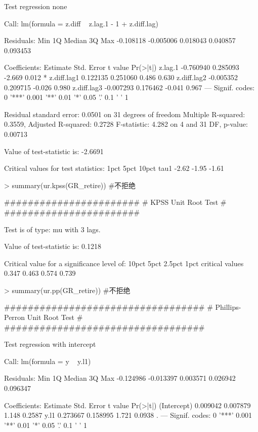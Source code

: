 \documentclass{article}
\begin{document}
\begin{Schunk}
\begin{Soutput}
Test regression none 


Call:
lm(formula = z.diff ~ z.lag.1 - 1 + z.diff.lag)

Residuals:
      Min        1Q    Median        3Q       Max 
-0.108118 -0.005006  0.018043  0.040857  0.093453 

Coefficients:
             Estimate Std. Error t value Pr(>|t|)  
z.lag.1     -0.760940   0.285093  -2.669    0.012 *
z.diff.lag1  0.122135   0.251060   0.486    0.630  
z.diff.lag2 -0.005352   0.209715  -0.026    0.980  
z.diff.lag3 -0.007293   0.176462  -0.041    0.967  
---
Signif. codes:  0 '***' 0.001 '**' 0.01 '*' 0.05 '.' 0.1 ' ' 1

Residual standard error: 0.0501 on 31 degrees of freedom
Multiple R-squared:  0.3559,	Adjusted R-squared:  0.2728 
F-statistic: 4.282 on 4 and 31 DF,  p-value: 0.00713


Value of test-statistic is: -2.6691 

Critical values for test statistics: 
      1pct  5pct 10pct
tau1 -2.62 -1.95 -1.61
\end{Soutput}
\begin{Sinput}
> summary(ur.kpss(GR_retire)) #不拒绝
\end{Sinput}
\begin{Soutput}
####################### 
# KPSS Unit Root Test # 
####################### 

Test is of type: mu with 3 lags. 

Value of test-statistic is: 0.1218 

Critical value for a significance level of: 
                10pct  5pct 2.5pct  1pct
critical values 0.347 0.463  0.574 0.739
\end{Soutput}
\begin{Sinput}
> summary(ur.pp(GR_retire)) #不拒绝
\end{Sinput}
\begin{Soutput}
################################## 
# Phillips-Perron Unit Root Test # 
################################## 

Test regression with intercept 


Call:
lm(formula = y ~ y.l1)

Residuals:
      Min        1Q    Median        3Q       Max 
-0.124986 -0.013397  0.003571  0.026942  0.096347 

Coefficients:
            Estimate Std. Error t value Pr(>|t|)  
(Intercept) 0.009042   0.007879   1.148   0.2587  
y.l1        0.273667   0.158995   1.721   0.0938 .
---
Signif. codes:  0 '***' 0.001 '**' 0.01 '*' 0.05 '.' 0.1 ' ' 1


\end{Soutput}
\end{Schunk}
\end{document}
